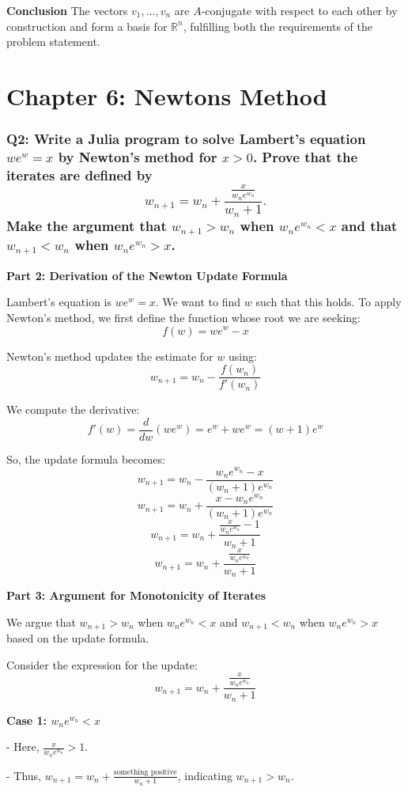 \documentclass[8pt]{article}
\begin{document}
\textbf{Conclusion}
The vectors \(v_1, \ldots, v_n\) are \(A\)-conjugate with respect to each other by construction and form a basis for \(\mathbb{R}^n\), fulfilling both the requirements of the problem statement.

\newpage
\section*{Chapter 6: Newtons Method}
\subsubsection*{Q2: Write a Julia program to solve Lambert’s equation \(we^w = x\) by Newton’s method for \(x > 0\). Prove that the iterates are defined by
\[ w_{n+1} = w_n + \frac{\frac{x}{w_n e^{w_n}}}{w_n + 1}. \]
Make the argument that \(w_{n+1} > w_n\) when \(w_n e^{w_n} < x\) and that \(w_{n+1} < w_n\) when \(w_n e^{w_n} > x\).}


\textbf{Part 2: Derivation of the Newton Update Formula}

Lambert's equation is \(we^w = x\). We want to find \(w\) such that this holds. To apply Newton's method, we first define the function whose root we are seeking:
\[ f(w) = we^w - x \]

Newton's method updates the estimate for \(w\) using:
\[ w_{n+1} = w_n - \frac{f(w_n)}{f'(w_n)} \]

We compute the derivative:
\[ f'(w) = \frac{d}{dw}(we^w) = e^w + we^w = (w + 1)e^w \]

So, the update formula becomes:
\[ w_{n+1} = w_n - \frac{w_n e^{w_n} - x}{(w_n + 1)e^{w_n}} \]
\[ w_{n+1} = w_n + \frac{x - w_n e^{w_n}}{(w_n + 1)e^{w_n}} \]
\[ w_{n+1} = w_n + \frac{\frac{x}{w_n e^{w_n}} - 1}{w_n + 1} \]
\[ w_{n+1} = w_n + \frac{\frac{x}{w_n e^{w_n}}}{w_n + 1} \]

\textbf{Part 3: Argument for Monotonicity of Iterates}

We argue that \(w_{n+1} > w_n\) when \(w_n e^{w_n} < x\) and \(w_{n+1} < w_n\) when \(w_n e^{w_n} > x\) based on the update formula.

Consider the expression for the update:
\[ w_{n+1} = w_n + \frac{\frac{x}{w_n e^{w_n}}}{w_n + 1} \]

\textbf{Case 1: \(w_n e^{w_n} < x\)}

- Here, \(\frac{x}{w_n e^{w_n}} > 1\).

- Thus, \(w_{n+1} = w_n + \frac{\text{something positive}}{w_n + 1}\), indicating \(w_{n+1} > w_n\).
\end{document}
